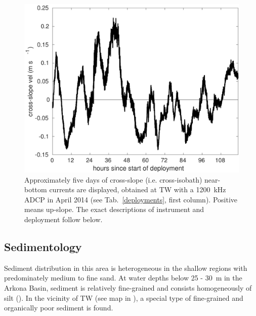   \begin{figure}[ht]
\includegraphics[width=30pc]{bilder/abslope.pdf}
 \caption{Approximately five days of cross-slope (i.e. cross-isobath) 
near-bottom currents are displayed, obtained at TW with a 1200~kHz ADCP in 
April 
2014 (see Tab.\ \ref{deployments}, first column). Positive means up-slope. The 
exact descriptions of instrument and deployment follow below.} \label{abslope}
 \end{figure}

 \FloatBarrier
\subsection{Sedimentology}\label{sedmol}

  Sediment distribution in this area is heterogeneous in the shallow regions 
with predominately medium to fine sand. At water depths below 25 - 30~m in the 
Arkona Basin, sediment is relatively fine-grained and consists homogeneously of 
silt (). In the vicinity of TW (see map in ), a 
special type of fine-grained 
and organically poor sediment is found. 


